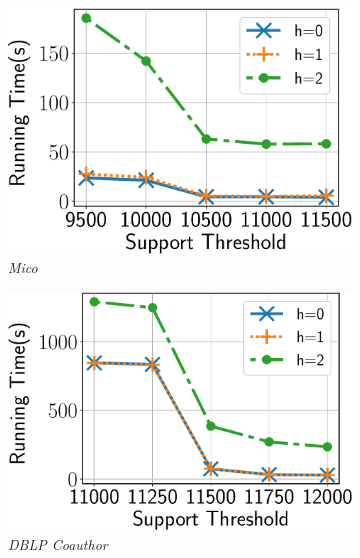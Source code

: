 \begin{figure}
\begin{subfigure}[b]{0.25\textwidth}
		\includegraphics[keepaspectratio, scale=0.24, angle=0]{img2/mico/mico_running_time_nobound.pdf}
		\caption{{\em Mico}}
		\label{fig:mico_nosb}
	\end{subfigure}%
	\begin{subfigure}[b]{0.25\textwidth}
		\includegraphics[keepaspectratio, scale=0.24, angle=0]{img2/coauthordblp/coauthordblp_running_time_nobound.pdf}
		\caption{{\em DBLP Coauthor}}
		\label{fig:coauthordblp_nosb}
	\end{subfigure}%
	\begin{subfigure}[b]{0.25\textwidth}

\end{subfigure}
\end{figure}
